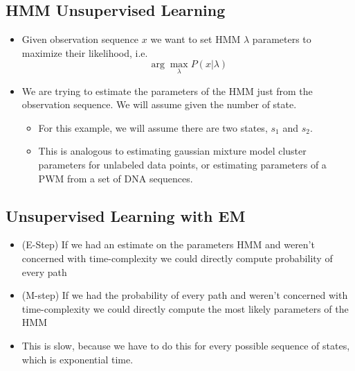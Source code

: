 \documentclass[10pt]{article}
\begin{document}
\subsection*{HMM Unsupervised Learning}
\begin{itemize}
	\item Given observation sequence $x$ we want to set HMM $\lambda$ parameters to maximize their likelihood, i.e.
	\[\arg\max_{\lambda} P(x|\lambda)\]
    \item We are trying to estimate the parameters of the HMM just from the observation sequence.  We will assume given the number of state.
    \begin{itemize}
        \item For this example, we will assume there are two states, $s_1$ and $s_2$.
        \item This is analogous to estimating gaussian mixture model cluster parameters for unlabeled data points, or estimating parameters of a PWM from a set of DNA sequences.
    \end{itemize}
\end{itemize}

\subsection*{Unsupervised Learning with EM}
\begin{itemize}
	\item (E-Step) If we had an estimate on the parameters HMM and weren't concerned with time-complexity we could directly compute probability of every path
	\item (M-step) If we had the probability of every path and weren't concerned with time-complexity we could directly compute the most likely parameters of the HMM
	\item This is slow, because we have to do this for every possible sequence of states, which is exponential time.
\end{itemize}
\end{document}
